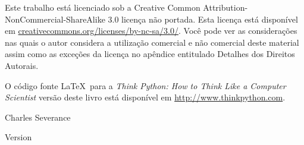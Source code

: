 \begin{latexonly}
{Este trabalho está licenciado sob a 
Creative Common
Attribution-NonCommercial-ShareAlike 3.0 licença não portada.
Esta licença está
disponível em
\url{creativecommons.org/licenses/by-nc-sa/3.0/}.  Você pode 
ver as considerações nas quais o autor considera a utilização comercial e não comercial
deste material assim como as exceções da licença
no apêndice entitulado Detalhes dos Direitos Autorais.

O código fonte \LaTeX\ para a 
\emph{Think Python: How to Think Like
a Computer Scientist}
versão deste livro está disponível em
\url{http://www.thinkpython.com}.

\vspace{0.2in}

} %

\end{latexonly}



\begin{htmlonly}


{\Large \thetitle}

{\large 
Charles Severance}

Version \theversion

\setcounter{chapter}{-1}

\end{htmlonly}
